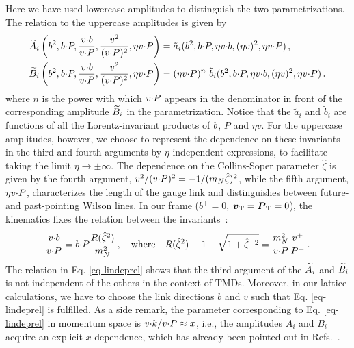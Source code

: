Here we have used lowercase amplitudes to distinguish the two parametrizations. The relation to the uppercase amplitudes is given by
\begin{align}
	\widetilde{A}_i\left(b^2,b {\cdot} P,\frac{v {\cdot} b}{v {\cdot} P}, \frac{v^2}{(v {\cdot} P)^2}, \eta v {\cdot} P\right) & = \tilde a_i(b^2,b {\cdot} P, \eta v {\cdot} b, (\eta v)^2, \eta v {\cdot} P)   \, , \nonumber \\
	 \widetilde{B}_i\left(b^2,b {\cdot} P,\frac{v {\cdot} b}{v {\cdot} P}, \frac{v^2}{(v {\cdot} P)^2}, \eta v {\cdot} P\right) & = (\eta v {\cdot} P)^n\ \tilde b_i(b^2,b {\cdot} P, \eta v {\cdot} b, (\eta v)^2, \eta v {\cdot} P)   \, .
	\label{eq-ab}
\end{align}
where $n$ is the power with which $v {\cdot} P$ appears in the denominator in front of the corresponding amplitude $\widetilde{B}_i$ in the parametrization. 
Notice that the $\tilde a_i$ and $\tilde b_i$ are functions of all the Lorentz-invariant products of $b$, $P$ and $\eta v$.
For the uppercase amplitudes, however, we choose to represent the dependence on these invariants in the third and fourth arguments by $\eta$-independent expressions, to facilitate taking the limit $\eta \rightarrow \pm \infty$. 
The dependence on the Collins-Soper parameter $\hat\zeta$ is given by the fourth argument, $v^2/(v {\cdot} P)^2 = - 1 /(m_N\hat\zeta)^2$, 
while the fifth argument, $\eta v {\cdot} P$, characterizes the length of the gauge link and distinguishes between future- and past-pointing
Wilson lines. 
In our frame ($b^+=0$, $\boldsymbol{v}_{\mathrm T}=\boldsymbol{P}_{\mathrm T}=0$), the kinematics fixes the relation between the invariants~\cite{MuschThesis2, Accardi:2009au}:
\begin{align}
	\frac{v {\cdot} b}{v {\cdot} P} = b {\cdot} P \frac{R({\hat \zeta}^2)}{m_N^2}\, , \quad \text{where} \quad R({\hat \zeta}^2) \equiv 1- \sqrt{1 + \hat \zeta^{-2}} = \frac{m_N^2}{v {\cdot} P} \frac{v^+}{P^+} \, .
	\label{eq-lindeprel}
\end{align}
The relation in Eq. \eqref{eq-lindeprel} shows that the third argument of the $\widetilde{A}_i$ and $\widetilde{B}_i$ is not independent of the others in the context of TMDs.
Moreover, in our lattice calculations, we have to choose the link directions $b$ and $v$ such that Eq. \eqref{eq-lindeprel} is fulfilled. 
As a side remark, the parameter corresponding to Eq. \eqref{eq-lindeprel} in momentum space is $v {\cdot} k / v {\cdot} P \approx x$, i.e., the amplitudes $A_i$ and $B_i$ acquire an explicit $x$-dependence, which has already been pointed out in Refs.~\cite{MuschThesis2,Accardi:2009au}.


